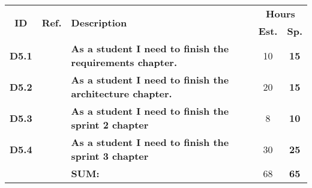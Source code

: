   \label{tab:sprint5Documentationstories}
 \def\arraystretch{1.25}
 
\begin{longtable}{ccXcc}

\toprule[0.5mm]
\multirow{2}{*}{\textbf{ID}} &
\multirow{2}{*}{\textbf{Ref.}} & \multirow{2}{*}{\textbf{Description}} & \multicolumn{2}{c}{\textbf{Hours}} \\
 					& & & \textbf{Est.} & \textbf{Sp.} \\
\midrule

\textbf{D5.1} 	&   & {\bf As a student I need to finish the requirements chapter.} 			& 	10	& \textbf{ 15} \\

\textbf{D5.2} 	&   & {\bf As a student I need to finish the architecture chapter.} 			& 	20  & \textbf{ 15} \\
	
\textbf{D5.3} 	&	& {\bf As a student I need to finish the sprint 2 chapter} 					&   8  	& \textbf{10} \\

\textbf{D5.4} 	&	& {\bf As a student I need to finish the sprint 3 chapter} 					& 	30 	& \textbf{25} \\


\midrule
		
				&	& \textbf{SUM:}		&		68	& \textbf{65}
 \\																			
\bottomrule[0.5mm]
\end{longtable}
